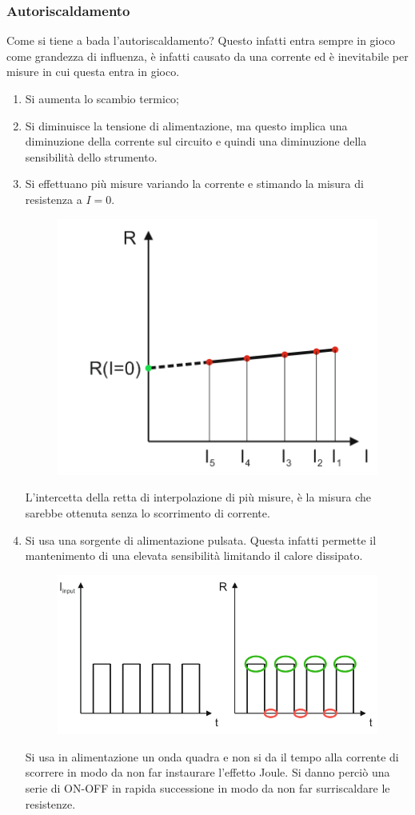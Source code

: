 \documentclass[a4paper, 15pt]{article}
\begin{document}
\subsubsection{Autoriscaldamento}	
\begin{adjustwidth}{2in}{}
		Come si tiene a bada l'autoriscaldamento? Questo infatti entra sempre in gioco come grandezza di influenza, è infatti causato da una corrente ed è inevitabile per misure in cui questa entra in gioco. 
		\begin{enumerate}
			\item Si aumenta lo scambio termico;
			\item Si diminuisce la tensione di alimentazione, ma questo implica una diminuzione della corrente sul circuito e quindi una diminuzione della sensibilità dello strumento. 
			\item  Si effettuano più misure variando la corrente e stimando la misura di resistenza a $ I=0 $.			
			\begin{figure}[H]
				\centering
				\includegraphics[width=0.5\linewidth]{fig/screenshot023(1)}
				\label{fig:screenshot0231}
			\end{figure}
			L'intercetta della retta di interpolazione di più misure, è la misura che sarebbe ottenuta senza lo scorrimento di corrente.
			
			\item Si usa una sorgente di alimentazione pulsata. Questa infatti permette il mantenimento di una elevata sensibilità limitando il calore dissipato.
\begin{figure}[H]
	\centering
	\includegraphics[width=0.5\linewidth]{fig/screenshot023(2)}
	\label{fig:screenshot0232}
\end{figure}
			Si usa in alimentazione un onda quadra e non si da il tempo alla corrente di scorrere in modo da non far instaurare l'effetto Joule. Si danno perciò una serie di ON-OFF in rapida successione in modo da non far surriscaldare le resistenze. 
			

\end{enumerate}
\end{adjustwidth}
\end{document}
